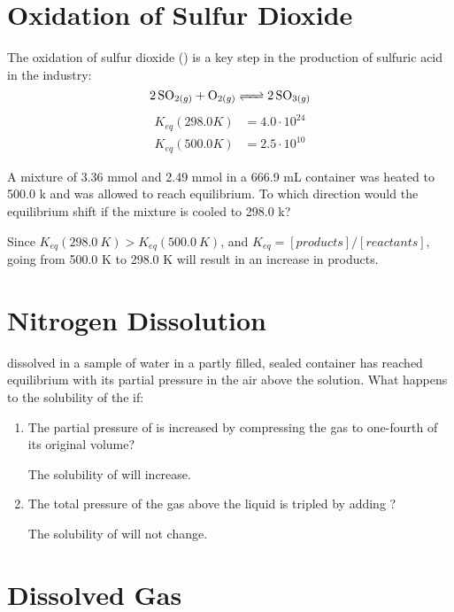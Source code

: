 \documentclass{article}
\begin{document}
\section{Oxidation of Sulfur Dioxide}

The oxidation of sulfur dioxide () is a key step in the production of
sulfuric acid in the industry:
$$\ce{2SO_{2(g)} + O_{2(g)} <=> 2SO_{3(g)}}$$
\begin{align*}
    K_{eq}(298.0 \si{K})&=4.0\cdot10^{24}\\
    K_{eq}(500.0 \si{K})&=2.5\cdot10^{10}
\end{align*}

A mixture of 3.36 \si{mmol}  and 2.49 \si{mmol}  in a 666.9
\si{mL} container was heated to 500.0 \si{k} and was allowed to reach
equilibrium. To which direction would the equilibrium shift if the mixture is
cooled to 298.0 \si{k}?

Since $K_{eq}(298.0\ \si{K}) > K_{eq}(500.0\ \si{K})$, and
$K_{eq}=[products]/[reactants]$, going from 500.0 \si{K} to 298.0 \si{K} will
result in an increase in products.

\section{Nitrogen Dissolution}

 dissolved in a sample of water in a partly filled, sealed
container has reached equilibrium with its partial pressure in the air above the
solution. What happens to the solubility of the  if:

\begin{enumerate}
    \item The partial pressure of  is increased by compressing the
        gas to one-fourth of its original volume?
    
    The solubility of  will increase.
    
    \item The total pressure of the gas above the liquid is tripled by adding
        ?
    
    The solubility of  will not change.
    
\end{enumerate}

\section{Dissolved Gas}
\end{document}
